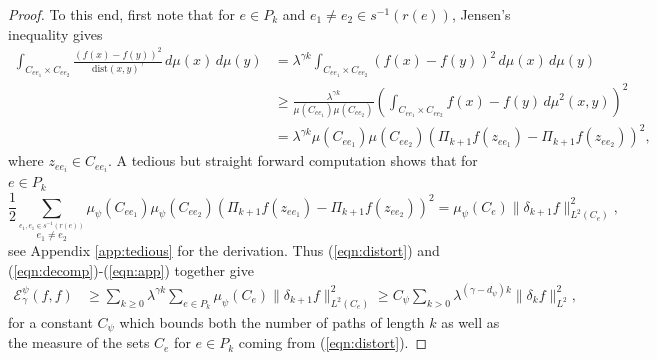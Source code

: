 \documentclass[12pt]{amsart}
\theoremstyle{plain}
\theoremstyle{definition}
\begin{document}
\begin{proof}
To this end, first note that for $e\in P_k$ and $e_1\neq e_2 \in s^{-1}(r(e))$, Jensen's inequality gives
\begin{equation}
\label{eqn:Jensen}
\begin{split}
\int_{C_{ee_1}\times C_{ee_2}}\frac{(f(x)-f(y))^2}{\mathrm{dist}(x,y)^\gamma}\, d\mu(x) \, d\mu(y) &= \lambda^{\gamma k} \int_{C_{ee_1}\times C_{ee_2}} (f(x)-f(y))^2\, d\mu(x) \, d\mu(y) \\ 
&\geq   \frac{\lambda^{\gamma k}}{\mu(C_{ee_1})\mu(C_{ee_2})} \left( \int_{C_{ee_1}\times C_{ee_2}}f(x) - f(y)\,d\mu^2(x,y)  \right)^2 \\
& = \lambda^{\gamma k}\mu(C_{ee_1})\mu(C_{ee_2})\left(\Pi_{k+1}f(z_{ee_1})- \Pi_{k+1}f(z_{ee_2})\right)^2,
\end{split}
\end{equation}
where $z_{ee_i}\in C_{ee_i}$.  
A tedious but straight forward computation shows that for $e\in P_k$
\begin{equation}
    \label{eqn:app}
    \frac12 \sum_{\overset{e_1,e_1\in s^{-1}(r(e))}{e_1\neq e_2}}\mu_\psi(C_{ee_1})\mu_\psi(C_{ee_2})\left(\Pi_{k+1}f(z_{ee_1})- \Pi_{k+1}f(z_{ee_2})\right)^2  = \mu_\psi(C_e) \|\delta_{k+1} f \|^2_{L^2(C_e)},
\end{equation}
see Appendix \ref{app:tedious} for the derivation. Thus (\ref{eqn:distort}) and (\ref{eqn:decomp})-(\ref{eqn:app}) together give
\begin{align*}
    \mathcal{E}^\psi _\gamma(f,f) &\geq  \sum_{k\geq 0}  \lambda^{\gamma k}\sum_{e\in P_k}  \mu_\psi(C_e) \|\delta_{k+1} f\|^2_{L^2(C_e)} \geq C_\psi \sum_{k>  0}\lambda^{(\gamma-d_\psi) k}\|\delta_k f\|^2_{L^2},
\end{align*}
for a constant $C_\psi$ which bounds both the number of paths of length $k$ as well as the measure of the sets $C_e$ for $e\in P_k$ coming from (\ref{eqn:distort}).
\end{proof}
\end{document}
